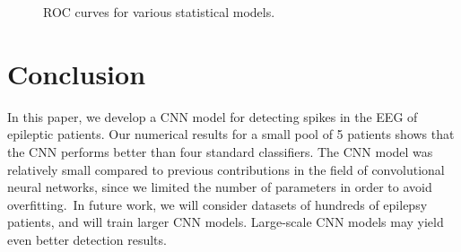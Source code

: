 \documentclass{article}
\begin{document}
\begin{figure}[htb]
    \centering
    \setlength\fboxsep{0pt}
    \setlength{}
    \caption{ROC curves for various statistical models.}
    \label{fig:ROC}
\end{figure}

\section{Conclusion}

In this paper, we develop a CNN model for detecting spikes in the EEG of epileptic patients.
Our numerical results for a small pool of 5 patients shows that the CNN performs better than four standard classifiers.
The CNN model was relatively small compared to previous contributions in the field of convolutional neural networks, since we limited the number of parameters in order to avoid overfitting.~In future work, we will consider datasets of hundreds of epilepsy patients, and will train larger CNN models. Large-scale CNN models may yield even better detection results.



\end{document}
